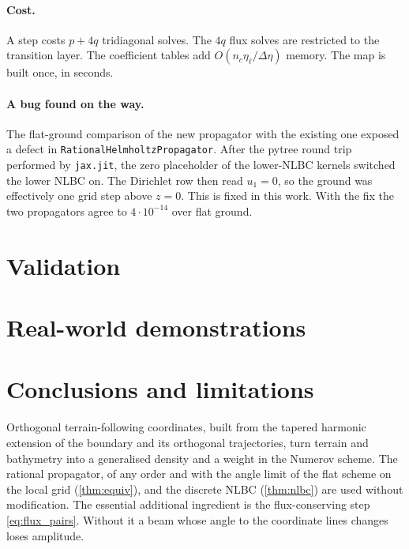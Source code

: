\documentclass[11pt,a4paper]{article}
\theoremstyle{remark}
\newcommand{\etal}{\eta_{\ell}}
\begin{document}
\paragraph{Cost.} A step costs $p+4q$ tridiagonal solves. The $4q$ flux solves
are restricted to the transition layer. The coefficient tables add
$O(n_c\etal/\Delta\eta)$ memory. The map is built once, in seconds.

\paragraph{A bug found on the way.} The flat-ground comparison of the new
propagator with the existing one exposed a defect in
\texttt{RationalHelmholtzPropagator}. After the pytree round trip performed by
\texttt{jax.jit}, the zero placeholder of the lower-NLBC kernels switched the lower
NLBC on. The Dirichlet row then read $u_1=0$, so the ground was effectively one
grid step above $z=0$. This is fixed in this work. With the fix the two
propagators agree to $4\cdot10^{-14}$ over flat ground.

\section{Validation}\label{sec:validation}



\section{Real-world demonstrations}\label{sec:realdata}



\section{Conclusions and limitations}\label{sec:conclusions}

Orthogonal terrain-following coordinates, built from the tapered harmonic
extension of the boundary and its orthogonal trajectories, turn terrain and
bathymetry into a generalised density and a weight in the Numerov scheme. The
rational propagator, of any order and with the angle limit of the flat scheme on
the local grid (\cref{thm:equiv}), and the discrete NLBC (\cref{thm:nlbc}) are
used without modification. The essential additional ingredient is the
flux-conserving step \eqref{eq:flux_pairs}. Without it a beam whose angle to the
coordinate lines changes loses amplitude.
\end{document}
